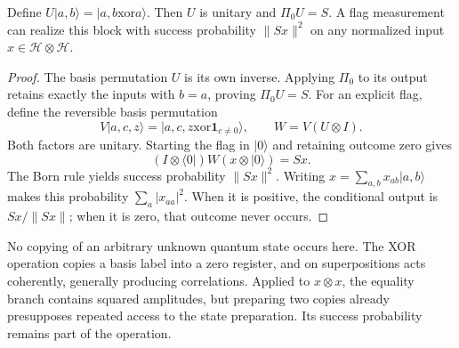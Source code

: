 \begin{proposition}
\label{prop:fluid-equality-unitary}
Define $U|a,b\rangle=|a,b\mathbin{\mathrm{xor}}a\rangle$. Then $U$ is unitary and $\Pi_0U=S$. A flag measurement can realize this block with success probability $\|Sx\|^2$ on any normalized input $x\in\mathcal H\otimes\mathcal H$.
\end{proposition}
\begin{proof}
The basis permutation $U$ is its own inverse. Applying $\Pi_0$ to its output retains exactly the inputs with $b=a$, proving $\Pi_0U=S$. For an explicit flag, define the reversible basis permutation
\[
 V|a,c,z\rangle=|a,c,z\mathbin{\mathrm{xor}}\mathbf1_{c\ne0}\rangle,
 \qquad W=V(U\otimes I).
\]
Both factors are unitary. Starting the flag in $|0\rangle$ and retaining outcome zero gives
\[
 (I\otimes\langle0|)W(x\otimes|0\rangle)=Sx.
\]
The Born rule yields success probability $\|Sx\|^2$. Writing $x=\sum_{a,b}x_{ab}|a,b\rangle$ makes this probability $\sum_a|x_{aa}|^2$. When it is positive, the conditional output is $Sx/\|Sx\|$; when it is zero, that outcome never occurs.
\end{proof}

No copying of an arbitrary unknown quantum state occurs here. The XOR operation copies a basis label into a zero register, and on superpositions acts coherently, generally producing correlations. Applied to $x\otimes x$, the equality branch contains squared amplitudes, but preparing two copies already presupposes repeated access to the state preparation. Its success probability remains part of the operation.

